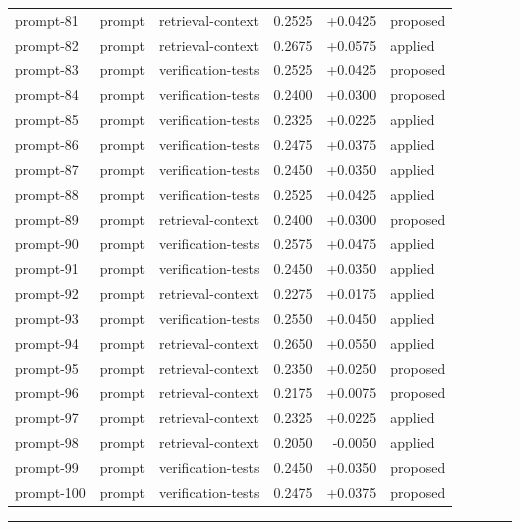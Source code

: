 \begin{center}
\begin{longtable}{llp{5.2cm}rrl}
prompt-81 & prompt & retrieval-context & 0.2525 & +0.0425 & proposed \\
prompt-82 & prompt & retrieval-context & 0.2675 & +0.0575 & applied \\
prompt-83 & prompt & verification-tests & 0.2525 & +0.0425 & proposed \\
prompt-84 & prompt & verification-tests & 0.2400 & +0.0300 & proposed \\
prompt-85 & prompt & verification-tests & 0.2325 & +0.0225 & applied \\
prompt-86 & prompt & verification-tests & 0.2475 & +0.0375 & applied \\
prompt-87 & prompt & verification-tests & 0.2450 & +0.0350 & applied \\
prompt-88 & prompt & verification-tests & 0.2525 & +0.0425 & applied \\
prompt-89 & prompt & retrieval-context & 0.2400 & +0.0300 & proposed \\
prompt-90 & prompt & verification-tests & 0.2575 & +0.0475 & applied \\
prompt-91 & prompt & verification-tests & 0.2450 & +0.0350 & applied \\
prompt-92 & prompt & retrieval-context & 0.2275 & +0.0175 & applied \\
prompt-93 & prompt & verification-tests & 0.2550 & +0.0450 & applied \\
prompt-94 & prompt & retrieval-context & 0.2650 & +0.0550 & applied \\
prompt-95 & prompt & retrieval-context & 0.2350 & +0.0250 & proposed \\
prompt-96 & prompt & retrieval-context & 0.2175 & +0.0075 & proposed \\
prompt-97 & prompt & retrieval-context & 0.2325 & +0.0225 & applied \\
prompt-98 & prompt & retrieval-context & 0.2050 & -0.0050 & applied \\
prompt-99 & prompt & verification-tests & 0.2450 & +0.0350 & proposed \\
prompt-100 & prompt & verification-tests & 0.2475 & +0.0375 & proposed \\
\bottomrule\end{longtable}\end{center}
\par\bigskip\hrule\bigskip
